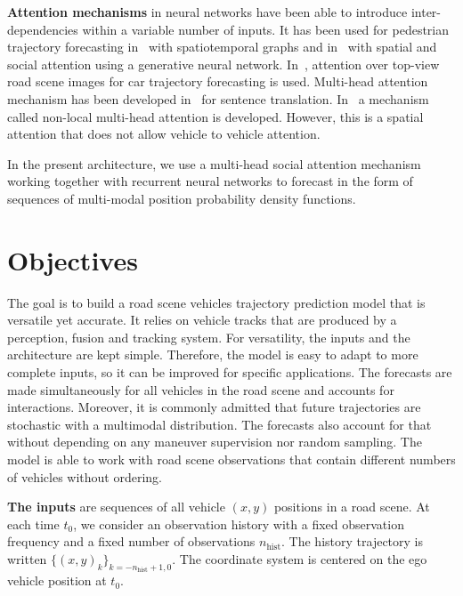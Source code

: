 \documentclass[a4paper, 10pt, conference]{ieeeconf}      %
\begin{document}
\textbf{Attention mechanisms} in neural networks have been able to introduce inter-dependencies within a variable
number of inputs.
It has been used for pedestrian trajectory forecasting in~\cite{Vemula2018} with spatiotemporal graphs and
in~\cite{Sadeghian2018a} with spatial and social attention using a generative neural network.
In~\cite{Sadeghian2018b}, attention over top-view road scene images for car trajectory forecasting is used.
Multi-head attention mechanism has been developed in~\cite{Vaswani2017} for sentence translation.
In~\cite{Messaoud2019} a mechanism called non-local  multi-head attention is developed.
However, this is a spatial attention that does not allow vehicle to vehicle attention.


In the present architecture, we use a multi-head social attention mechanism working together with
recurrent neural networks to forecast in the form of sequences of multi-modal position probability density
functions.

\section{Objectives}
\label{sec_obj}

The goal is to build a road scene vehicles trajectory prediction model that is versatile yet accurate.
It relies on vehicle tracks that are produced by a perception, fusion and tracking system.
For versatility, the inputs and the architecture are kept simple.
Therefore, the model is easy to adapt to more complete inputs, so it can be improved for specific applications.
The forecasts are made simultaneously for all vehicles in the road scene and accounts for interactions.
Moreover, it is commonly admitted that future trajectories are stochastic with a multimodal distribution.
The forecasts also account for that without depending on any maneuver supervision nor random sampling.
The model is able to work with road scene observations that contain different numbers of vehicles without ordering.

\label{sec_inout}


\textbf{The inputs} are sequences of all vehicle $(x, y)$ positions in a road scene.
At each time $t_0$, we consider an observation history with a fixed observation frequency and a
fixed number of observations $n_{\text{hist}}$.
The history trajectory is written $\{(x, y)_{k}\}_{k=-n_{\text{hist}}+1, 0}$.
The coordinate system is centered on the ego vehicle position at $t_0$.
\end{document}
